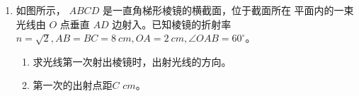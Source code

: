 \begin{enumerate}
\begin{enumerate}

\item 
如图所示， $A B C D$ 是一直角梯形棱镜的横截面，位于截面所在
平面内的一束光线由 $O$ 点垂直 $A D$ 边射入。已知棱镜的折射率
$n=\sqrt{2}, A B=B C=8 \ cm, O A=2 \ cm,  \angle O A B=60^{\circ}$。
\begin{enumerate}
	\item
	求光线第一次射出棱镜时，出射光线的方向。
	\item 
	第一次的出射点距$ C $ \underlinegap $ cm $。
	
	
	
\end{enumerate}
\begin{figure}[h!]
	\flushright
	
\end{figure}








\end{enumerate}



\end{enumerate}

